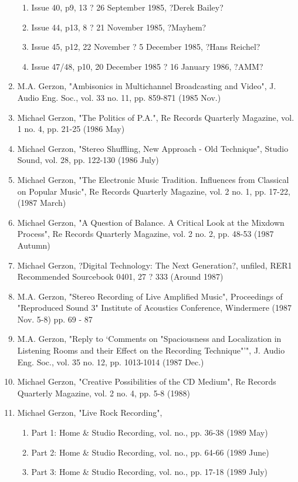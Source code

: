 \documentclass[9pt]{amsart}
\begin{document}
\begin{enumerate}
\begin{enumerate}
	\item Issue 40, p9, 13 ? 26 September 1985, ?Derek Bailey?
	\item Issue 44, p13, 8 ? 21 November 1985, ?Mayhem?
	\item Issue 45, p12, 22 November ? 5 December 1985, ?Hans Reichel?
	\item Issue 47/48, p10, 20 December 1985 ? 16 January 1986, ?AMM?
	\end{enumerate}
\item M.A. Gerzon, "Ambisonics in Multichannel Broadcasting and Video", J. Audio Eng. Soc., vol. 33 no. 11, pp. 859-871 (1985 Nov.)
\item Michael Gerzon, "The Politics of P.A.", Re Records Quarterly Magazine, vol. 1 no. 4, pp. 21-25 (1986 May)
\item Michael Gerzon, "Stereo Shuffling, New Approach - Old Technique", Studio Sound, vol. 28, pp. 122-130 (1986 July)
\item Michael Gerzon, "The Electronic Music Tradition. Influences from Classical on Popular Music", Re Records Quarterly Magazine, vol. 2 no. 1, pp. 17-22, (1987 March)
\item Michael Gerzon, "A Question of Balance. A Critical Look at the Mixdown Process", Re Records Quarterly Magazine, vol. 2 no. 2, pp. 48-53 (1987 Autumn)
\item Michael Gerzon, ?Digital Technology: The Next Generation?, unfiled, RER1 Recommended Sourcebook 0401, 27 ? 333 (Around 1987)
\item M.A. Gerzon, "Stereo Recording of Live Amplified Music", Proceedings of "Reproduced Sound 3" Institute of Acoustics Conference, Windermere (1987 Nov. 5-8) pp. 69 - 87
\item M.A. Gerzon, "Reply to `Comments on "Spaciousness and Localization in Listening Rooms and their Effect on the Recording Technique"'", J. Audio Eng. Soc., vol. 35 no. 12, pp. 1013-1014 (1987 Dec.)
\item Michael Gerzon, "Creative Possibilities of the CD Medium", Re Records Quarterly Magazine, vol. 2 no. 4, pp. 5-8 (1988)
\item Michael Gerzon, "Live Rock Recording",
\begin{enumerate}
	\item Part 1: Home \& Studio Recording, vol. no., pp. 36-38 (1989 May)
	\item Part 2: Home \& Studio Recording, vol. no., pp. 64-66 (1989 June)
	\item Part 3: Home \& Studio Recording, vol. no., pp. 17-18 (1989 July)

\end{enumerate}
\end{enumerate}
\end{document}
